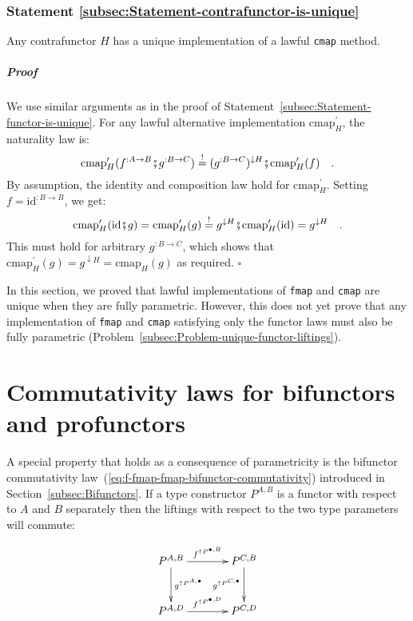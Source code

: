 \subsubsection{Statement \label{subsec:Statement-contrafunctor-is-unique}\ref{subsec:Statement-contrafunctor-is-unique}}

Any contrafunctor $H$ has a unique implementation of a lawful \lstinline!cmap!
method. 

\subparagraph{Proof}

We use similar arguments as in the proof of Statement~\ref{subsec:Statement-functor-is-unique}.
For any lawful alternative implementation $\text{cmap}_{H}^{\prime}$,
the naturality law is:
\[
\text{cmap}_{H}^{\prime}(f^{:A\rightarrow B}\bef g^{:B\rightarrow C})\overset{!}{=}(g^{:B\rightarrow C})^{\downarrow H}\bef\text{cmap}_{H}^{\prime}(f)\quad.
\]
By assumption, the identity and composition law hold for $\text{cmap}_{H}^{\prime}$.
Setting $f=\text{id}^{:B\rightarrow B}$, we get:
\[
\text{cmap}_{H}^{\prime}(\text{id}\bef g)=\text{cmap}_{H}^{\prime}(g)\overset{!}{=}g^{\downarrow H}\bef\text{cmap}_{H}^{\prime}(\text{id})=g^{\downarrow H}\quad.
\]
This must hold for arbitrary $g^{:B\rightarrow C}$, which shows that
$\text{cmap}_{H}^{\prime}(g)=g^{\downarrow H}=\text{cmap}_{H}(g)$
as required. $\square$

In this section, we proved that lawful implementations of \lstinline!fmap!
and \lstinline!cmap! are unique when they are fully parametric. However,
this does not yet prove that any implementation of \lstinline!fmap!
and \lstinline!cmap! satisfying only the functor laws must also be
fully parametric (Problem~\ref{subsec:Problem-unique-functor-liftings}).

\section{Commutativity laws for bifunctors and profunctors\label{sec:Commutativity-laws-for-type-constructors}}

A special property that holds as a consequence of parametricity is
the bifunctor commutativity law~(\ref{eq:f-fmap-fmap-bifunctor-commutativity})
introduced in Section~\ref{subsec:Bifunctors}. If a type constructor
$P^{A,B}$ is a functor with respect to $A$ and $B$ separately then
the liftings with respect to the two type parameters will commute:

\begin{wrapfigure}{l}{0.28\columnwidth}%
\vspace{-1.9\baselineskip}
\[
\xymatrix{\xyScaleY{2.5pc}\xyScaleX{3.0pc}P^{A,B}\ar[r]\sp(0.5){f^{\uparrow P^{\bullet,B}}}\ar[d]\sp(0.45){g^{\uparrow P^{A,\bullet}}} & P^{C,B}\ar[d]\sb(0.45){g^{\uparrow P^{C,\bullet}}}\\
P^{A,D}\ar[r]\sp(0.5){f^{\uparrow P^{\bullet,D}}} & P^{C,D}
}
\]

\vspace{-1\baselineskip}
\end{wrapfigure}%

